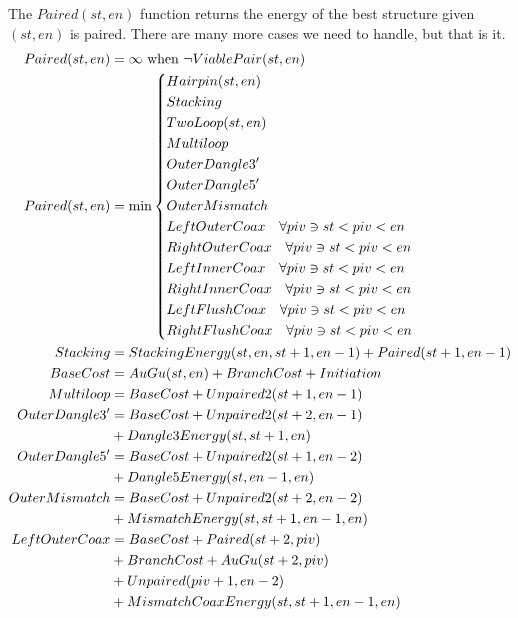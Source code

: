 \documentclass{cshonours}
\newcommand{\NOT}{\neg}
\begin{document}
The $Paired(st, en)$ function returns the energy of the best structure given $(st, en)$ is paired. There are many more cases we need to handle, but that is it.
\begin{align*}
Paired(st, en) &= \infty \text{ when } \NOT ViablePair(st, en) \\
Paired(st, en) &= \min{\begin{dcases*}
  Hairpin(st, en) \\
  Stacking \\
  TwoLoop(st, en) \\
  Multiloop \\
  OuterDangle3' \\
  OuterDangle5' \\
  OuterMismatch \\
  LeftOuterCoax \quad \forall piv \ni st < piv < en \\
  RightOuterCoax \quad \forall piv \ni st < piv < en \\
  LeftInnerCoax \quad \forall piv \ni st < piv < en \\
  RightInnerCoax \quad \forall piv \ni st < piv < en \\
  LeftFlushCoax \quad \forall piv \ni st < piv < en \\
  RightFlushCoax \quad \forall piv \ni st < piv < en \\
\end{dcases*}} \\
Stacking &= StackingEnergy(st, en, st + 1, en - 1) + Paired(st + 1, en - 1) \\
BaseCost &= AuGu(st, en) + BranchCost + Initiation \\
Multiloop &= BaseCost + Unpaired2(st + 1, en - 1) \\
OuterDangle3' &= BaseCost + Unpaired2(st + 2, en - 1) \\
  &+ Dangle3Energy(st, st + 1, en) \\
OuterDangle5' &= BaseCost + Unpaired2(st + 1, en - 2) \\
  &+ Dangle5Energy(st, en - 1, en) \\
OuterMismatch &= BaseCost + Unpaired2(st + 2, en - 2) \\
  &+ MismatchEnergy(st, st + 1, en - 1, en) \\
LeftOuterCoax &= BaseCost + Paired(st + 2, piv) \\
  &+ BranchCost + AuGu(st + 2, piv) \\
  &+ Unpaired(piv + 1, en - 2) \\
  &+ MismatchCoaxEnergy(st, st + 1, en - 1, en) \\

\end{align*}
\end{document}
